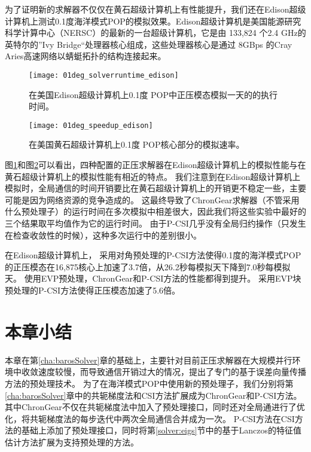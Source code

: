  
为了证明新的求解器不仅仅在黄石超级计算机上有性能提升，我们还在Edison超级计算机上测试0.1度海洋模式POP的模拟效果。Edison超级计算机是美国能源研究科学计算中心（NERSC）的最新的一台超级计算机，它是由 133,824 个2.4 GHz的英特尔的”Ivy Bridge“处理器核心组成，这些处理器核心是通过 8GBps 的Cray
Aries高速网络以蜻蜓拓扑的结构连接起来。  


\begin {figure}
\centering
\texttt{[image: 01deg\_solverruntime\_edison]}
\caption []{在美国Edison超级计算机上0.1度 POP中正压模态模拟一天的的执行时间。\label {fig:runtime01_edison_time}}
\end {figure}

\begin {figure}
\centering
\texttt{[image: 01deg\_speedup\_edison]}
\caption []{在美国黄石超级计算机上0.1度 POP核心部分的模拟速率。\label {fig:runtime01_edison_rate}}
\end {figure}

图\ref{fig:runtime01_edison_time}和图\ref{fig:runtime01_edison_rate}可以看出，四种配置的正压求解器在Edison超级计算机上的模拟性能与在黄石超级计算机上的模拟性能有相近的特点。 
我们注意到在Edison超级计算机上模拟时，全局通信的时间开销要比在黄石超级计算机上的开销更不稳定一些，主要可能是因为网络资源的竞争造成的\cite{wang2014}。 
这最终导致了ChronGear求解器（不管采用什么预处理子）的运行时间在多次模拟中相差很大，因此我们将这些实验中最好的三个结果取平均值作为它的运行时间。 
由于P-CSI几乎没有全局归约操作（只发生在检查收敛性的时候），这种多次运行中的差别很小。 

 
在Edison超级计算机上， 采用对角预处理的P-CSI方法使得0.1度的海洋模式POP的正压模态在16,875核心上加速了3.7倍，从26.2秒每模拟天下降到7.0秒每模拟天。 
使用EVP预处理，ChronGear和P-CSI方法的性能都得到提升。 
采用EVP块预处理的P-CSI方法使得正压模态加速了5.6倍。 
 


\section{本章小结}
\label{precond:Conclusion}

本章在第\ref{cha:barosSolver}章的基础上，主要针对目前正压求解器在大规模并行环境中收敛速度较慢，而导致通信开销过大的情况，提出了专门的基于误差向量传播方法的预处理技术。
为了在海洋模式POP中使用新的预处理子，我们分别将第\ref{cha:barosSolver}章中的共轭梯度法和CSI方法扩展成为ChronGear和P-CSI方法。
其中ChronGear不仅在共轭梯度法中加入了预处理接口，同时还对全局通进行了优化，将共轭梯度法的每步迭代中两次全局通信合并成为一次。 
P-CSI方法在CSI方法的基础上添加了预处理接口，同时将第\ref{solver:eigs}节中的基于Lanczos的特征值估计方法扩展为支持预处理的方法。


